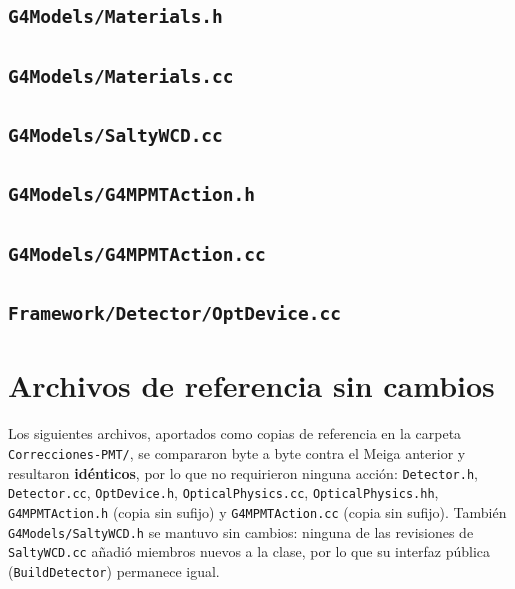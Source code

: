 \documentclass[11pt,a4paper]{article}
\newcommand{\codigo}[1]{\nolinkurl{#1}}
\begin{document}
\subsection{\texorpdfstring{\codigo{G4Models/Materials.h}}{G4Models/Materials.h}}


\subsection{\texorpdfstring{\codigo{G4Models/Materials.cc}}{G4Models/Materials.cc}}


\subsection{\texorpdfstring{\codigo{G4Models/SaltyWCD.cc}}{G4Models/SaltyWCD.cc}}


\subsection{\texorpdfstring{\codigo{G4Models/G4MPMTAction.h}}{G4Models/G4MPMTAction.h}}


\subsection{\texorpdfstring{\codigo{G4Models/G4MPMTAction.cc}}{G4Models/G4MPMTAction.cc}}


\subsection{\texorpdfstring{\codigo{Framework/Detector/OptDevice.cc}}{Framework/Detector/OptDevice.cc}}


\section{Archivos de referencia sin cambios}

Los siguientes archivos, aportados como copias de referencia en la carpeta
\codigo{Correcciones-PMT/}, se compararon byte a byte contra el Meiga
anterior y resultaron \textbf{idénticos}, por lo que no requirieron ninguna
acción: \codigo{Detector.h}, \codigo{Detector.cc}, \codigo{OptDevice.h},
\codigo{OpticalPhysics.cc}, \codigo{OpticalPhysics.hh},
\codigo{G4MPMTAction.h} (copia sin sufijo) y \codigo{G4MPMTAction.cc}
(copia sin sufijo). También \codigo{G4Models/SaltyWCD.h} se mantuvo sin
cambios: ninguna de las revisiones de \codigo{SaltyWCD.cc} añadió
miembros nuevos a la clase, por lo que su interfaz pública
(\codigo{BuildDetector}) permanece igual.
\end{document}
